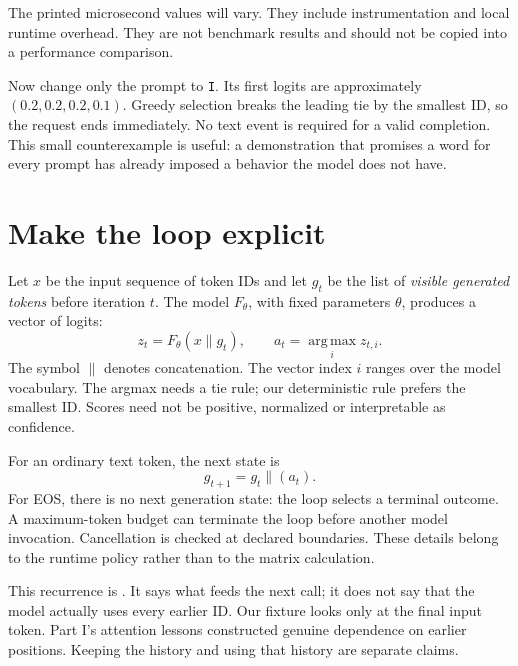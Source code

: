 The printed microsecond values will vary. They include instrumentation and
local runtime overhead. They are not benchmark results and should not be copied
into a performance comparison.


Now change only the prompt to \texttt{I}. Its first logits are approximately
$(0.2,0.2,0.2,0.1)$. Greedy selection breaks the leading tie by the smallest ID,
so the request ends immediately. No text event is required for a valid
completion. This small counterexample is useful: a demonstration that promises
a word for every prompt has already imposed a behavior the model does not have.

\section{Make the loop explicit}
Let $x$ be the input sequence of token IDs and let $g_t$ be the list of
\emph{visible generated tokens} before iteration $t$. The model $F_\theta$,
with fixed parameters $\theta$, produces a vector of logits:
\begin{equation}
z_t=F_\theta(x\mathbin{\|}g_t),\qquad
a_t=\operatorname*{arg\,max}_{i}z_{t,i}.
\label{eq:lifecycle-choice}
\end{equation}
The symbol $\|$ denotes concatenation. The vector index $i$ ranges over the
model vocabulary. The argmax needs a tie rule; our deterministic rule prefers
the smallest ID. Scores need not be positive, normalized or interpretable as
confidence.

For an ordinary text token, the next state is
\begin{equation}
g_{t+1}=g_t\mathbin{\|}(a_t).
\label{eq:lifecycle-feedback}
\end{equation}
For EOS, there is no next generation state: the loop selects a terminal
outcome. A maximum-token budget can terminate the loop before another model
invocation. Cancellation is checked at declared boundaries. These details
belong to the runtime policy rather than to the matrix calculation.

This recurrence is . It says what feeds the next call;
it does not say that the model actually uses every earlier ID. Our fixture
looks only at the final input token. Part I's attention lessons constructed
genuine dependence on earlier positions. Keeping the history and using that
history are separate claims.

